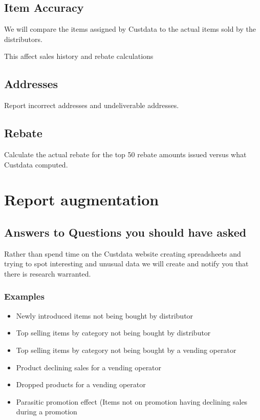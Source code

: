 \documentclass[letterpaper,10pt,english]{sphinxmanual}
\begin{document}
\subsection{Item Accuracy}
\label{\detokenize{index:item-accuracy}}
We will compare the items assigned by Custdata to the actual items sold by the distributors.

This affect sales history and rebate calculations


\subsection{Addresses}
\label{\detokenize{index:addresses}}
Report incorrect addresses and undeliverable addresses.


\subsection{Rebate}
\label{\detokenize{index:rebate}}
Calculate the actual rebate for the top 50 rebate amounts issued versus what Custdata
computed.


\section{Report augmentation}
\label{\detokenize{index:report-augmentation}}

\subsection{Answers to Questions you should have asked}
\label{\detokenize{index:answers-to-questions-you-should-have-asked}}
Rather than spend time on the Custdata website creating spreadsheets and trying to spot
interesting and unusual data we will create  and notify you that
there is research warranted.


\subsubsection{Examples}
\label{\detokenize{index:examples}}\begin{itemize}
\item {} 
Newly introduced items not being bought by distributor

\item {} 
Top selling items by category not being bought by distributor

\item {} 
Top selling items by category not being bought by a vending operator

\item {} 
Product declining sales for a vending operator

\item {} 
Dropped products for a vending operator

\item {} 
Parasitic promotion effect (Items not on promotion having declining sales during a promotion

\end{itemize}
\end{document}
